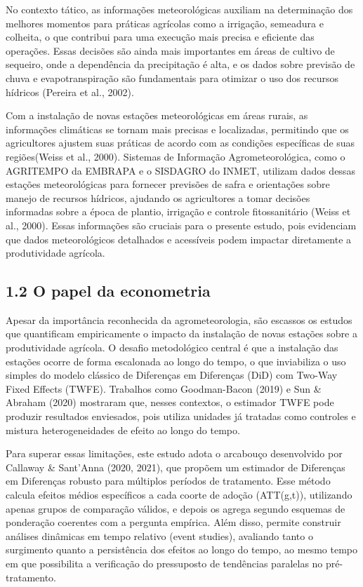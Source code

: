 \documentclass[
  brazilian,
  12pt,
  a4paper,
]{article}
\begin{document}
No contexto tático, as informações meteorológicas auxiliam na
determinação dos melhores momentos para práticas agrícolas como a
irrigação, semeadura e colheita, o que contribui para uma execução mais
precisa e eficiente das operações. Essas decisões são ainda mais
importantes em áreas de cultivo de sequeiro, onde a dependência da
precipitação é alta, e os dados sobre previsão de chuva e
evapotranspiração são fundamentais para otimizar o uso dos recursos
hídricos (Pereira et al., 2002).

Com a instalação de novas estações meteorológicas em áreas rurais, as
informações climáticas se tornam mais precisas e localizadas, permitindo
que os agricultores ajustem suas práticas de acordo com as condições
específicas de suas regiões(Weiss et al., 2000). Sistemas de Informação
Agrometeorológica, como o AGRITEMPO da EMBRAPA e o SISDAGRO do INMET,
utilizam dados dessas estações meteorológicas para fornecer previsões de
safra e orientações sobre manejo de recursos hídricos, ajudando os
agricultores a tomar decisões informadas sobre a época de plantio,
irrigação e controle fitossanitário (Weiss et al., 2000). Essas
informações são cruciais para o presente estudo, pois evidenciam que
dados meteorológicos detalhados e acessíveis podem impactar diretamente
a produtividade agrícola.

\subsection{\texorpdfstring{\textbf{1.2 O papel da
econometria}}{1.2 O papel da econometria}}\label{o-papel-da-econometria}

Apesar da importância reconhecida da agrometeorologia, são escassos os
estudos que quantificam empiricamente o impacto da instalação de novas
estações sobre a produtividade agrícola. O desafio metodológico central
é que a instalação das estações ocorre de forma escalonada ao longo do
tempo, o que inviabiliza o uso simples do modelo clássico de Diferenças
em Diferenças (DiD) com Two-Way Fixed Effects (TWFE). Trabalhos como
Goodman-Bacon (2019) e Sun \& Abraham (2020) mostraram que, nesses
contextos, o estimador TWFE pode produzir resultados enviesados, pois
utiliza unidades já tratadas como controles e mistura heterogeneidades
de efeito ao longo do tempo.

Para superar essas limitações, este estudo adota o arcabouço
desenvolvido por Callaway \& Sant'Anna (2020, 2021), que propõem um
estimador de Diferenças em Diferenças robusto para múltiplos períodos de
tratamento. Esse método calcula efeitos médios específicos a cada coorte
de adoção (ATT(g,t)), utilizando apenas grupos de comparação válidos, e
depois os agrega segundo esquemas de ponderação coerentes com a pergunta
empírica. Além disso, permite construir análises dinâmicas em tempo
relativo (event studies), avaliando tanto o surgimento quanto a
persistência dos efeitos ao longo do tempo, ao mesmo tempo em que
possibilita a verificação do pressuposto de tendências paralelas no
pré-tratamento.
\end{document}

